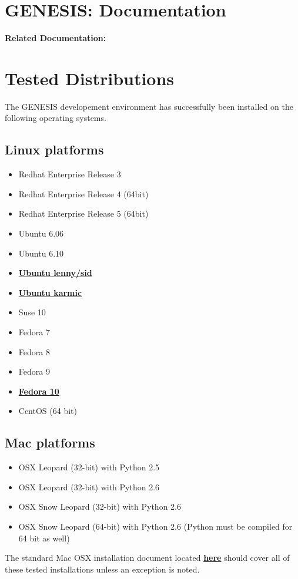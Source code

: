 \documentclass[12pt]{article}
\begin{document}
\section*{GENESIS: Documentation}

{\bf Related Documentation:}

\section*{Tested Distributions}

The GENESIS developement environment has successfully been installed on the following operating systems.

\subsection*{Linux platforms}

\begin{itemize}
\item Redhat Enterprise Release 3
\item Redhat Enterprise Release 4 (64bit)
\item Redhat Enterprise Release 5 (64bit)
\item Ubuntu 6.06
\item Ubuntu 6.10
\item \href{../installation-ubuntu-lennysid/installation-ubuntu-lennysid.tex}{\bf Ubuntu lenny/sid}
\item \href{../installation-ubuntu-karmic/installation-ubuntu-karmic.tex}{\bf Ubuntu karmic}
\item Suse 10
\item Fedora 7
\item Fedora 8
\item Fedora 9
\item \href{../installation-fedora10/installation-fedora10.tex}{\bf Fedora 10}
\item CentOS (64 bit)%
\end{itemize}

\subsection*{Mac platforms}

\begin{itemize}

\item OSX Leopard (32-bit) with Python 2.5
\item OSX Leopard (32-bit) with Python 2.6
\item OSX Snow Leopard (32-bit) with Python 2.6
\item OSX Snow Leopard (64-bit) with Python 2.6 (Python must be compiled for 64 bit as well)

\end{itemize}

The standard Mac OSX installation document located \href{../installation-osx/installation-osx.tex}{\bf here}
 should cover all of these tested installations unless an exception is noted.
\end{document}
